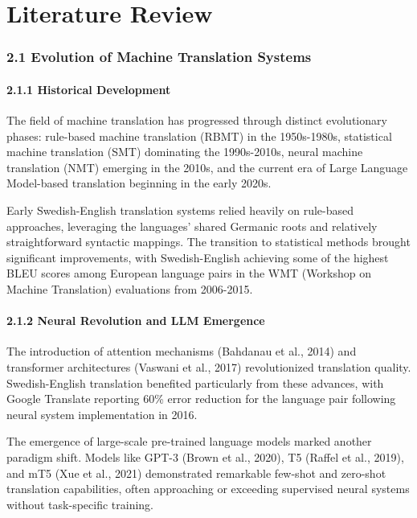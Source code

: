 \documentclass[12pt,a4paper]{article}
\begin{document}
\hypertarget{literature-review}{%
\section{Literature Review}

\hypertarget{evolution-of-machine-translation-systems}{%
\subsubsection{2.1 Evolution of Machine Translation
Systems}\label{evolution-of-machine-translation-systems}}

\hypertarget{historical-development}{%
\paragraph{2.1.1 Historical Development}\label{historical-development}}

The field of machine translation has progressed through distinct
evolutionary phases: rule-based machine translation (RBMT) in the
1950s-1980s, statistical machine translation (SMT) dominating the
1990s-2010s, neural machine translation (NMT) emerging in the 2010s, and
the current era of Large Language Model-based translation beginning in
the early 2020s.

Early Swedish-English translation systems relied heavily on rule-based
approaches, leveraging the languages' shared Germanic roots and
relatively straightforward syntactic mappings. The transition to
statistical methods brought significant improvements, with
Swedish-English achieving some of the highest BLEU scores among European
language pairs in the WMT (Workshop on Machine Translation) evaluations
from 2006-2015.

\hypertarget{neural-revolution-and-llm-emergence}{%
\paragraph{2.1.2 Neural Revolution and LLM
Emergence}\label{neural-revolution-and-llm-emergence}}

The introduction of attention mechanisms (Bahdanau et al., 2014) and
transformer architectures (Vaswani et al., 2017) revolutionized
translation quality. Swedish-English translation benefited particularly
from these advances, with Google Translate reporting 60\% error
reduction for the language pair following neural system implementation
in 2016.

The emergence of large-scale pre-trained language models marked another
paradigm shift. Models like GPT-3 (Brown et al., 2020), T5 (Raffel et
al., 2019), and mT5 (Xue et al., 2021) demonstrated remarkable few-shot
and zero-shot translation capabilities, often approaching or exceeding
supervised neural systems without task-specific training.

}
\end{document}
